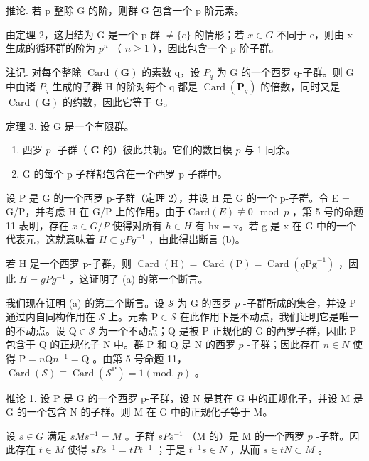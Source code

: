 推论. 若 p 整除 G 的阶，则群 G 包含一个 p 阶元素。

由定理 2，这归结为 G 是一个 p-群 \(\neq\{e\}\) 的情形；若 \(x\in G\) 不同于 e，则由 x 生成的循环群的阶为 \(p^{n}\) （ \(n\geqslant1\) ），因此包含一个 p 阶子群。

注记. 对每个整除 \(\operatorname{Card}(\mathbf{G})\) 的素数 q，设 \(P_{q}\) 为 G 的一个西罗 q-子群。则 G 中由诸 \(P_{q}\) 生成的子群 H 的阶对每个 q 都是 \(\operatorname{Card}(\mathbf{P}_{q})\) 的倍数，同时又是 \(\operatorname{Card}(\mathbf{G})\) 的约数，因此它等于 G。

定理 3. 设 G 是一个有限群。

\begin{enumerate}
\def\labelenumi{(\alph{enumi})}
\item
  西罗 \(p\) -子群（ \(\mathbf{G}\) 的）彼此共轭。它们的数目模 \(p\) 与 1 同余。
\item
  G 的每个 p-子群都包含在一个西罗 p-子群中。
\end{enumerate}

设 P 是 G 的一个西罗 p-子群（定理 2），并设 H 是 G 的一个 p-子群。令 E = G/P，并考虑 H 在 G/P 上的作用。由于 \(\text{Card}(E) \not\equiv 0 \mod p\) ，第 5 号的命题 11 表明，存在 \(x \in G/P\) 使得对所有 \(h \in H\) 有 hx = x。若 g 是 x 在 G 中的一个代表元，这就意味着 \(H \subset gPg^{-1}\) ，由此得出断言 (b)。

若 H 是一个西罗 p-子群，则 \(\operatorname{Card}(\mathrm{H}) = \operatorname{Card}(\mathrm{P}) = \operatorname{Card}(g\mathrm{Pg}^{-1})\) ，因此 \(H = gPg^{-1}\) ，这证明了 (a) 的第一个断言。

我们现在证明 (a) 的第二个断言。设 \(\mathcal{S}\) 为 G 的西罗 \(p\) -子群所成的集合，并设 P 通过内自同构作用在 \(\mathcal{S}\) 上。元素 \(\mathrm{P} \in \mathcal{S}\) 在此作用下是不动点，我们证明它是唯一的不动点。设 \(\mathrm{Q} \in \mathcal{S}\) 为一个不动点；Q 是被 P 正规化的 G 的西罗子群，因此 P 包含于 Q 的正规化子 N 中。群 P 和 Q 是 N 的西罗 \(p\) -子群；因此存在 \(n \in N\) 使得 \(\mathrm{P} = n\mathrm{Q}n^{-1} = \mathrm{Q}\) 。由第 5 号命题 11， \(\operatorname{Card}(\mathcal{S}) \equiv \operatorname{Card}(\mathcal{S}^{\mathrm{P}}) = 1 (\text{mod. } p)\) 。

推论 1. 设 P 是 G 的一个西罗 p-子群，设 N 是其在 G 中的正规化子，并设 M 是 G 的一个包含 N 的子群。则 M 在 G 中的正规化子等于 M。

设 \(s \in G\) 满足 \(sMs^{-1} = M\) 。子群 \(sPs^{-1}\) （M 的）是 M 的一个西罗 \(p\) -子群。因此存在 \(t \in M\) 使得 \(sPs^{-1} = tPt^{-1}\) ；于是 \(t^{-1}s \in N\) ，从而 \(s \in tN \subset M\) 。

